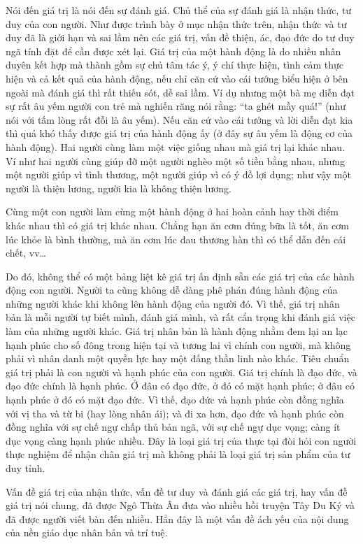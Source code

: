 Nói đến giá trị là nói đến sự đánh giá. Chủ thể của sự đánh giá là nhận thức, tư duy của con người. Như được trình bày ở mục nhận thức trên, nhận thức và tư duy đã là giới hạn và sai lầm nên các giá trị, vấn đề thiện, ác, đạo đức do tư duy ngã tính đặt để cần được xét lại. Giá trị của một hành động là do nhiều nhân duyên kết hợp mà thành gồm sự chủ tâm tác ý, ý chí thực hiện, tình cảm thực hiện và cả kết quả của hành động, nếu chỉ căn cứ vào cái tướng biểu hiện ở bên ngoài mà đánh giá thì rất thiếu sót, dễ sai lầm. Ví dụ nhưng một bà mẹ diễn đạt sự rất âu yếm người con trẻ mà nghiến răng nói rằng: ``ta ghét mầy quá!'' (như nói với tấm lòng rất đỗi là âu yếm). Nếu căn cứ vào cái tướng và lời diễn đạt kia thì quả khó thấy được giá trị của hành động ấy (ở đây sự âu yếm là động cơ của hành động). Hai người cùng làm một việc giống nhau mà giá trị lại khác nhau. Ví như hai người cùng giúp đỡ một người nghèo một số tiền bằng nhau, nhưng một người giúp vì tình thương, một người giúp vì có ý đồ lợi dụng; như vậy một người là thiện lương, người kia là không thiện lương.

Cùng một con người làm cùng một hành động ở hai hoàn cảnh hay thời điểm khác nhau thì có giá trị khác nhau. Chẳng hạn ăn cơm đúng bữa là tốt, ăn cơm lúc khỏe là bình thường, mà ăn cơm lúc đau thương hàn thì có thể dẫn đến cái chết, vv\ldots

Do đó, không thể có một bảng liệt kê giá trị ấn định sẵn các giá trị của các hành động con người. Người ta cũng không dễ dàng phê phán đúng hành động của những người khác khi không lên hành động của người đó. Vì thế, giá trị nhân bản là mỗi người tự biết mình, đánh giá mình, và rất cẩn trọng khi đánh giá việc làm của những người khác. Giá trị nhân bản là hành động nhằm đem lại an lạc hạnh phúc cho số đông trong hiện tại và tương lai vì chính con người, mà không phải vì nhân danh một quyền lực hay một đấng thần linh nào khác. Tiêu chuẩn giá trị phải là con người và hạnh phúc của con người. Giá trị chính là đạo đức, và đạo đức chính là hạnh phúc. Ở đâu có đạo đức, ở đó có mặt hạnh phúc; ở đâu có hạnh phúc ở đó có mặt đạo đức. Vì thế, đạo đức và hạnh phúc còn đồng nghĩa với vị tha và từ bi (hay lòng nhân ái); và đi xa hơn, đạo đức và hạnh phúc còn đồng nghĩa với sự chế ngự chấp thủ bản ngã, với sự chế ngự dục vọng; càng ít dục vọng càng hạnh phúc nhiều. Đây là loại giá trị của thực tại đòi hỏi con người thực nghiệm để nhận chân giá trị mà không phải là loại giá trị sản phẩm của tư duy tỉnh.

Vấn đề giá trị của nhận thức, vấn đề tư duy và đánh giá các giá trị, hay vấn đề giá trị nói chung, đã được Ngô Thừa Ân đưa vào nhiều hồi truyện Tây Du Ký và đã được người viết bàn đến nhiều. Hẳn đây là một vấn đề ách yếu của nội dung của nền giáo dục nhân bản và trí tuệ.

